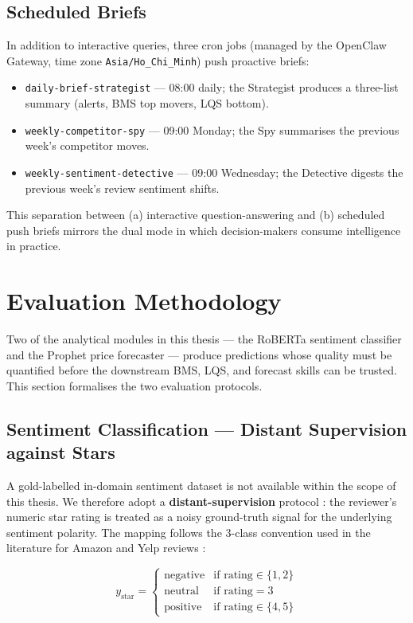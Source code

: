 \subsection{Scheduled Briefs}

In addition to interactive queries, three cron jobs (managed by the OpenClaw
Gateway, time zone \texttt{Asia/Ho\_Chi\_Minh}) push proactive briefs:

\begin{itemize}
  \item \texttt{daily-brief-strategist} --- 08:00 daily; the Strategist
  produces a three-list summary (alerts, BMS top movers, LQS bottom).
  \item \texttt{weekly-competitor-spy} --- 09:00 Monday; the Spy summarises
  the previous week's competitor moves.
  \item \texttt{weekly-sentiment-detective} --- 09:00 Wednesday; the
  Detective digests the previous week's review sentiment shifts.
\end{itemize}

This separation between (a) interactive question-answering and (b) scheduled
push briefs mirrors the dual mode in which decision-makers consume
intelligence in practice.

\section{Evaluation Methodology}

Two of the analytical modules in this thesis --- the RoBERTa sentiment
classifier and the Prophet price forecaster --- produce predictions whose
quality must be quantified before the downstream BMS, LQS, and forecast
skills can be trusted. This section formalises the two evaluation protocols.

\subsection{Sentiment Classification --- Distant Supervision against Stars}

A gold-labelled in-domain sentiment dataset is not available within the scope
of this thesis. We therefore adopt a \textbf{distant-supervision} protocol
\cite{go2009twitter}: the reviewer's numeric star rating is treated as a
noisy ground-truth signal for the underlying sentiment polarity. The mapping
follows the 3-class convention used in the literature for Amazon and Yelp
reviews \cite{mcauley2013amateurs}:

\begin{equation}
  y_{\text{star}} = \begin{cases}
    \text{negative} & \text{if rating} \in \{1, 2\} \\
    \text{neutral}  & \text{if rating} = 3 \\
    \text{positive} & \text{if rating} \in \{4, 5\}
  \end{cases}
\end{equation}

